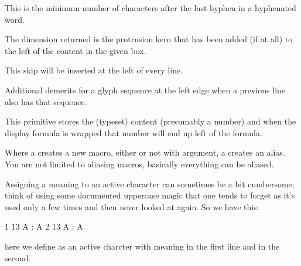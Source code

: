 \startoldprimitive[title={\prm {lefthyphenmin}}]

This is the minimum number of characters after the last hyphen in a hyphenated
word.

\stopoldprimitive

\startnewprimitive[title={\prm {leftmarginkern}}]

The dimension returned is the protrusion kern that has been added (if at all)
to the left of the content in the given box.

\stopnewprimitive

\startoldprimitive[title={\prm {leftskip}}]

This skip will be inserted at the left of every line.

\stopoldprimitive

\startnewprimitive[title={\prm {lefttwindemerits}}]

Additional demerits for a glyph sequence at the left edge when a previous line
also has that sequence.

\stopnewprimitive

\startoldprimitive[title={\prm {leqno}}]

This primitive stores the (typeset) content (presumably a number) and when the
display formula is wrapped that number will end up left of the formula.

\stopoldprimitive

\startoldprimitive[title={\prm {let}}]

Where a  creates a new macro, either or not with argument, a 
creates an alias. You are not limited to aliasing macros, basically everything
can be aliased.

\stopoldprimitive

\startnewprimitive[title={\prm {letcharcode}}]

Assigning a meaning to an active character can sometimes be a bit cumbersome;
think of using some documented uppercase magic that one tends to forget as it's
used only a few times and then never looked at again. So we have this:

\startbuffer
{ 1  13 A : \meaning A}\crlf
{ 2  13 A : \meaning A}\par
\stopbuffer

\typebuffer

here we define  as an active charcter with meaning  in the
first line and  in the second.

{\tttf \getbuffer}

